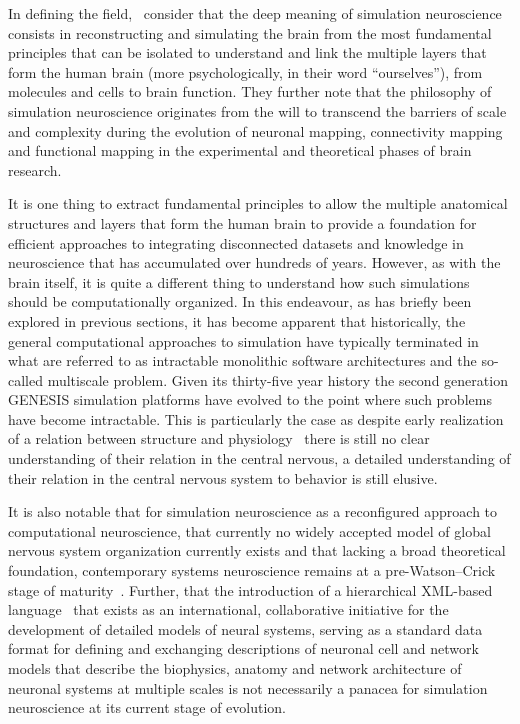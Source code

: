 \documentclass[11pt,3p,twocolumn]{JMN}
\begin{document}
In defining the field,~\cite{fan19} consider that the deep meaning of simulation neuroscience consists in reconstructing and simulating the brain from the most fundamental principles that can be isolated to understand and link the multiple layers that form the human brain (more psychologically, in their word ``ourselves''), from molecules and cells to brain function. They further note that the philosophy of simulation neuroscience originates from the will to transcend the barriers of scale and complexity during the evolution of neuronal mapping, connectivity mapping and functional mapping in the experimental and theoretical phases of brain research.

It is one thing to extract fundamental principles to allow the multiple anatomical structures and layers that form the human brain to provide a foundation for efficient approaches to integrating disconnected datasets and knowledge in neuroscience that has accumulated over hundreds of years. However, as with the brain itself, it is quite a different thing to understand how such simulations should be computationally organized. In this endeavour, as has briefly been explored in previous sections, it has become apparent that historically, the general computational approaches to simulation have typically terminated in what are referred to as intractable monolithic software architectures and the so-called multiscale problem. Given its thirty-five year history the second generation GENESIS simulation platforms have evolved to the point where such problems have become intractable. This is particularly the case as despite early realization of a relation between structure and physiology~\citep[see, for example][]{sieck17} there is still no clear understanding of their relation in the central nervous, a detailed understanding of their relation in the central nervous system to behavior is still elusive.

It is also notable that for simulation neuroscience as a reconfigured approach to computational neuroscience, that currently no widely accepted model of global nervous system organization currently exists and that lacking a broad theoretical foundation, contemporary systems neuroscience remains at a pre-Watson–Crick stage of maturity~\citep{swanson10}. Further, that the introduction of a hierarchical XML-based language~\citep{} that exists as an international, collaborative initiative for the development of detailed models of neural systems, serving as a standard data format for defining and exchanging descriptions of neuronal cell and network models that describe the biophysics, anatomy and network architecture of neuronal systems at multiple scales is not necessarily a panacea for simulation neuroscience at its current stage of evolution.
\end{document}
